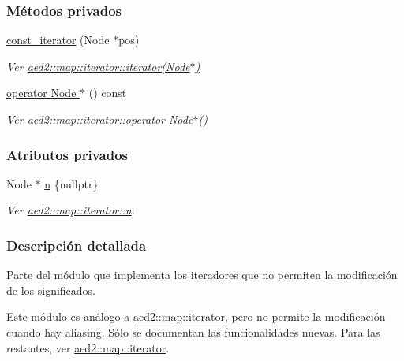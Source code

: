 \subsubsection*{Métodos privados}
\begin{DoxyCompactItemize}
\item 
\hyperlink{classaed2_1_1iterator_1_1const__iterator_a8ef6d37dab4cd4ccad630fd0fa6cf28a_a8ef6d37dab4cd4ccad630fd0fa6cf28a}{const\+\_\+iterator} (Node $\ast$pos)
\begin{DoxyCompactList}\small\item\em Ver \hyperlink{classaed2_1_1map_1_1iterator_ab0ea21abcb32b6d5a72cf341b9029838_ab0ea21abcb32b6d5a72cf341b9029838}{aed2\+::map\+::iterator\+::iterator(\+Node$\ast$)} \end{DoxyCompactList}\item 
\hyperlink{classaed2_1_1iterator_1_1const__iterator_af7cb6596f89769b8aa654d3bbb7384ab_af7cb6596f89769b8aa654d3bbb7384ab}{operator Node $\ast$} () const
\begin{DoxyCompactList}\small\item\em Ver aed2\+::map\+::iterator\+::operator Node$\ast$() \end{DoxyCompactList}\end{DoxyCompactItemize}
\subsubsection*{Atributos privados}
\begin{DoxyCompactItemize}
\item 
Node $\ast$ \hyperlink{classaed2_1_1iterator_1_1const__iterator_a5c8bd59060e4e2b8c1f1b8021cf212cf_a5c8bd59060e4e2b8c1f1b8021cf212cf}{n} \{nullptr\}
\begin{DoxyCompactList}\small\item\em Ver \hyperlink{classaed2_1_1map_1_1iterator_a1eb67290cc33d9739e0efaf02bbdab9f_a1eb67290cc33d9739e0efaf02bbdab9f}{aed2\+::map\+::iterator\+::n}. \end{DoxyCompactList}\end{DoxyCompactItemize}


\subsubsection{Descripción detallada}
Parte del módulo que implementa los iteradores que no permiten la modificación de los significados. 

Este módulo es análogo a \hyperlink{classaed2_1_1map_1_1iterator}{aed2\+::map\+::iterator}, pero no permite la modificación cuando hay aliasing. Sólo se documentan las funcionalidades nuevas. Para las restantes, ver \hyperlink{classaed2_1_1map_1_1iterator}{aed2\+::map\+::iterator}. 

